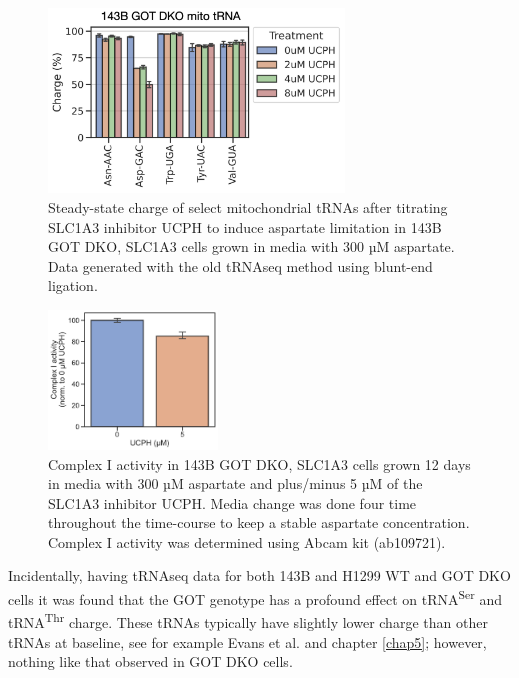 \begin{figure}[ht]
    \centering
    \includegraphics[width=0.7\textwidth]{figures/sapp/DKO_char/143B_GOT-DKO_UCPH-tit_tRNA.png}
    \caption[143B GOT DKO Asp titration using UCPH, tRNA charge]{
    Steady-state charge of select mitochondrial tRNAs after titrating SLC1A3 inhibitor UCPH to induce aspartate limitation in 143B GOT DKO, SLC1A3 cells grown in media with 300 µM aspartate.
    Data generated with the old tRNAseq method using blunt-end ligation.
    }
    \label{fig:sapp:DKO_char:143B_DKO_UCPH_tRNA}
\end{figure}

\begin{figure}[ht]
    \centering
    \includegraphics[width=0.4\textwidth]{figures/sapp/DKO_char/143B_GOT-DKO_CI-activity.pdf}
    \caption[143B GOT DKO Asp depletion effect on complex I]{
    Complex I activity in 143B GOT DKO, SLC1A3 cells grown 12 days in media with 300 µM aspartate and plus/minus 5 µM of the SLC1A3 inhibitor UCPH.
    Media change was done four time throughout the time-course to keep a stable aspartate concentration.
    Complex I activity was determined using Abcam kit (ab109721).
    }
    \label{fig:sapp:DKO_char:143B_DKO_CI}
\end{figure}



\FloatBarrier
Incidentally, having tRNAseq data for both 143B and H1299 WT and GOT DKO cells  it was found that the GOT genotype has a profound effect on tRNA\textsuperscript{Ser} and tRNA\textsuperscript{Thr} charge.
These tRNAs typically have slightly lower charge than other tRNAs at baseline, see for example Evans et al. \cite{Evans2017-st} and chapter \ref{chap5}; however, nothing like that observed in GOT DKO cells.


